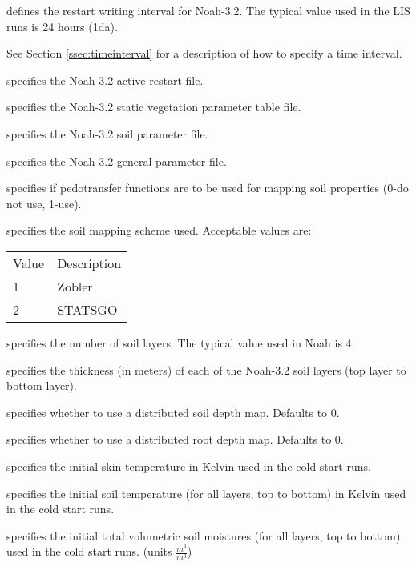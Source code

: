   defines the restart
 writing interval for Noah-3.2. The typical value used in the
 LIS runs is 24 hours (1da).

 See Section \ref{ssec:timeinterval} for a description
 of how to specify a time interval.

  specifies the Noah-3.2 active
 restart file.

  specifies the
 Noah-3.2 static vegetation parameter table file.

  specifies the
 Noah-3.2 soil parameter file.

  specifies the
 Noah-3.2 general parameter file.

  specifies if
 pedotransfer functions are to be used for mapping soil properties
 (0-do not use, 1-use).

  specifies the soil mapping scheme used.
 Acceptable values are:

 \begin{tabular}{ll}
 Value & Description \\
 1     & Zobler      \\
 2     & STATSGO     \\
 \end{tabular}

  specifies the number of
 soil layers. The typical value used in Noah is 4.

  specifies the thickness (in meters)
 of each of the Noah-3.2 soil layers (top layer to bottom layer).

  specifies whether
 to use a distributed soil depth map. Defaults to 0.

  specifies whether
 to use a distributed root depth map. Defaults to 0.

 specifies the initial skin temperature in Kelvin used in the
 cold start runs.

 specifies the initial soil temperature (for all layers,
 top to bottom) in Kelvin used in the cold start runs.

  specifies the
 initial total volumetric soil moistures (for all layers,
 top to bottom) used in the cold start runs.
 (units $\frac{m^3}{m^3}$)

